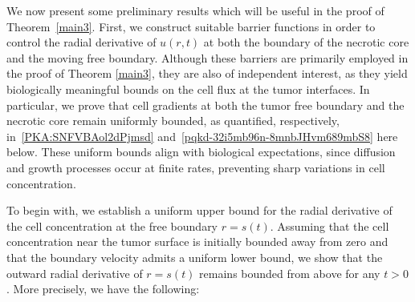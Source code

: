 \documentclass[12pt,a4paper,intlimits,sumlimits]{amsart}
\theoremstyle{definition}
\theoremstyle{plain}
\numberwithin{equation}{section}
\begin{document}
We now present some preliminary results which will be useful in the proof of Theorem~\ref{main3}.
First, we construct suitable barrier functions in order to control the radial derivative of $u(r,t)$ at both the boundary of the necrotic core and the moving free boundary.
Although these barriers are primarily employed in the proof of Theorem \ref{main3}, they are also of independent interest, as they yield biologically meaningful bounds on the cell flux at the tumor interfaces. In particular, we prove that cell gradients at both
the tumor free boundary and the necrotic core remain uniformly bounded,
as quantified, respectively,
in~\eqref{PKA:SNFVBAol2dPjmsd} and~\eqref{pqkd-32i5mb96n-8mnbJHvm689mbS8} here below. These uniform bounds align with biological expectations, since diffusion and growth processes occur at finite rates, preventing sharp variations in cell concentration.

To begin with, we establish a uniform upper bound for the radial derivative of the cell concentration at the free boundary $r=s(t)$.
Assuming that the cell concentration near the tumor surface is initially bounded away from zero and that the boundary velocity admits a uniform lower bound, we show that the outward radial derivative of $r=s(t)$ remains bounded from above for any $t>0$. 
More precisely, we have the following:
\end{document}
